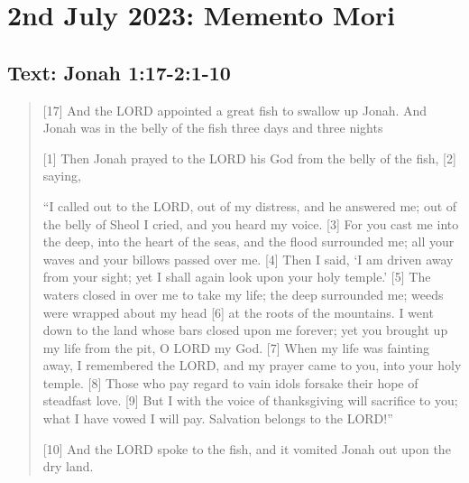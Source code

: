 \setcounter{figure}{0}

\section{2nd July 2023: Memento Mori}
\subsection*{Text: Jonah 1:17-2:1-10}
  \begin{quote}
    [17] And the LORD appointed a great fish to swallow up Jonah. And Jonah was in the belly of the fish three days and three nights

    [1] Then Jonah prayed to the LORD his God from the belly of the fish, [2] saying,

    “I called out to the LORD, out of my distress,
        and he answered me;
    out of the belly of Sheol I cried,
        and you heard my voice.
    [3] For you cast me into the deep,
        into the heart of the seas,
        and the flood surrounded me;
    all your waves and your billows
        passed over me.
    [4] Then I said, ‘I am driven away
        from your sight;
    yet I shall again look
        upon your holy temple.’
    [5] The waters closed in over me to take my life;
        the deep surrounded me;
    weeds were wrapped about my head
    [6]     at the roots of the mountains.
    I went down to the land
        whose bars closed upon me forever;
    yet you brought up my life from the pit,
        O LORD my God.
    [7] When my life was fainting away,
        I remembered the LORD,
    and my prayer came to you,
        into your holy temple.
    [8] Those who pay regard to vain idols
        forsake their hope of steadfast love.
    [9] But I with the voice of thanksgiving
        will sacrifice to you;
    what I have vowed I will pay.
        Salvation belongs to the LORD!”

    [10] And the LORD spoke to the fish, and it vomited Jonah out upon the dry land.
  \end{quote}
